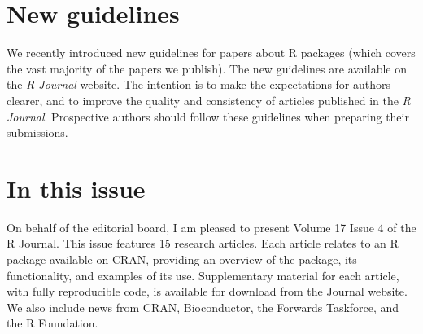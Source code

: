 \section*{New guidelines}\label{new-guidelines}

We recently introduced new guidelines for papers about R packages (which covers the vast majority of the papers we publish). The new guidelines are available on the \href{https://journal.r-project.org/R_package_guidelines.html}{\emph{R Journal} website}. The intention is to make the expectations for authors clearer, and to improve the quality and consistency of articles published in the \emph{R Journal}. Prospective authors should follow these guidelines when preparing their submissions.

\section*{In this issue}\label{in-this-issue}

On behalf of the editorial board, I am pleased to present Volume 17 Issue 4 of the R Journal. This issue features 15 research articles. Each article relates to an R package available on CRAN, providing an overview of the package, its functionality, and examples of its use. Supplementary material for each article, with fully reproducible code, is available for download from the Journal website. We also include news from CRAN, Bioconductor, the Forwards Taskforce, and the R Foundation.


\address{%
Rob J Hyndman\\
Monash University\\%
\\
%
\url{https://journal.r-project.org}\\%
%
\href{mailto:r-journal@r-project.org}{\nolinkurl{r-journal@r-project.org}}%
}
